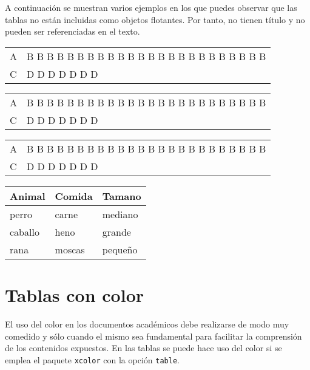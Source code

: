 \documentclass[11pt,a4paper]{article}
\begin{document}
A continuación se muestran varios ejemplos en los que puedes observar que las tablas no están incluidas como objetos flotantes. Por tanto, no tienen título y no pueden ser referenciadas en el texto.

\begin{center}
\begin{tabular}{lp{2cm}}
\hline
A & B B B B B B B B B B B B B B B B B B B B B B B B\\
C & D D D D D D D\\
\hline
\end{tabular}
\end{center}

\begin{center}  
\begin{tabularx}{.5\textwidth}{lX}
\hline
A & B B B B B B B B B B B B B B B B B B B B B B B B\\
C & D D D D D D D\\
\hline
\end{tabularx}
\end{center}

\begin{center}  
\begin{tabularx}{\textwidth}{lX}
\hline
A & B B B B B B B B B B B B B B B B B B B B B B B B\\
C & D D D D D D D\\
\hline
\end{tabularx}
\end{center}

\begin{center}
\begin{tabular}{lll}
  \toprule
  Animal  & Comida & Tamano  \\
  \midrule
  perro   & carne  & mediano \\
  \cmidrule{1-2}
  caballo & heno   & grande  \\
  \cmidrule{1-1}
  \cmidrule{3-3}
  rana    & moscas & pequeño \\
  \bottomrule
\end{tabular}
\end{center}




\section{Tablas con color}
El uso del color en los documentos académicos debe realizarse de modo muy comedido y sólo cuando el mismo sea fundamental para facilitar la comprensión de los contenidos expuestos. En las tablas se puede hace uso del color si se emplea el paquete \texttt{xcolor} con la opción \texttt{table}.
\end{document}
